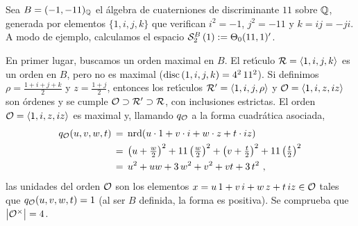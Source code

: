 Sea $B=\varquatalg[\bb{Q}]{-1,-11}$ el \'{a}lgebra de cuaterniones de
discriminante $11$ sobre $\bb{Q}$, generada por elementos $\{1,i,j,k\}$ que
verifican $i^2=-1$, $j^2=-11$ y $k=ij=-ji$.
A modo de ejemplo, calculamos el espacio $\spitz[B]{2}{1}:=\Theta_0(11,1)'$.

En primer lugar, buscamos un orden maximal en $B$. El ret\'{\i}culo
$\cal{R}=\generado{1,i,j,k}$ es un orden en $B$, pero no es maximal
($\discriminante{1,i,j,k}=4^2\,11^2$).
Si definimos $\rho=\frac{1+i+j+k}{2}$ y $z=\frac{1+j}{2}$, entonces los
ret\'{\i}culos $\cal{R}'=\generado{1,i,j,\rho}$ y
$\cal{O}=\generado{1,i,z,iz}$ son \'{o}rdenes y se cumple
$\cal{O}\supset\cal{R}'\supset\cal{R}$, con inclusiones estrictas.
El orden $\cal{O} = \generado{1,i,z,iz}$ es maximal y, llamando $q_{\cal{O}}$ a
la forma cuadr\'{a}tica asociada,
\begin{align*}
	q_{\cal{O}}(u,v,w,t) & \,=\,\nrd(u\cdot 1+v\cdot i+w\cdot z+t\cdot iz)
		\\
	& \,=\,\big(u+\tfrac{w}{2}\big)^{2}
		+ 11\,\big(\tfrac{w}{2}\big)^{2}
		+ \big(v+\tfrac{t}{2}\big)^{2}
		+ 11\,\big(\tfrac{t}{2}\big)^{2} \\
	& \,=\,u^{2}+uw+3\,w^{2} + v^{2} +vt + 3\,t^{2}
	\text{ ,}
\end{align*}
%
las unidades del orden $\cal{O}$ son los elementos
$x=u\,1+v\,i+w\,z+t\,iz\in\cal{O}$ tales que $q_{\cal{O}}(u,v,w,t)=1$
(al ser $B$ definida, la forma es positiva). Se comprueba que
$\big|\cal{O}^{\times}\big|=4$.

